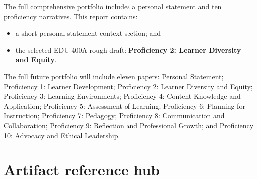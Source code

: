 \documentclass[12pt]{article}
\begin{document}
The full comprehensive portfolio includes a personal statement and ten proficiency narratives. This report contains:

\begin{itemize}
  \item a short personal statement context section; and
  \item the selected EDU 400A rough draft: \textbf{Proficiency 2: Learner Diversity and Equity}.
\end{itemize}

The full future portfolio will include eleven papers: Personal Statement; Proficiency 1: Learner Development; Proficiency 2: Learner Diversity and Equity; Proficiency 3: Learning Environments; Proficiency 4: Content Knowledge and Application; Proficiency 5: Assessment of Learning; Proficiency 6: Planning for Instruction; Proficiency 7: Pedagogy; Proficiency 8: Communication and Collaboration; Proficiency 9: Reflection and Professional Growth; and Proficiency 10: Advocacy and Ethical Leadership.

\section{Artifact reference hub}
\end{document}
